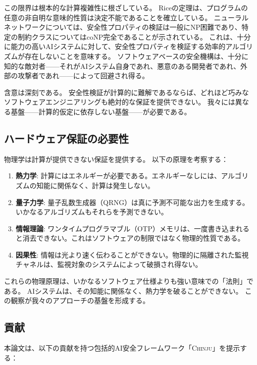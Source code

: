 \documentclass[11pt,a4paper]{article}
\newcommand{\chinju}{\textsc{Chinju}}
\begin{document}
この限界は根本的な計算複雑性に根ざしている。
Riceの定理は、プログラムの任意の非自明な意味的性質は決定不能であることを確立している。
ニューラルネットワークについては、安全性プロパティの検証は一般にNP困難であり、特定の制約クラスについてはcoNP完全であることが示されている。
これは、十分に能力の高いAIシステムに対して、安全性プロパティを検証する効率的アルゴリズムが存在しないことを意味する。
ソフトウェアベースの安全機構は、十分に知的な敵対者——それがAIシステム自身であれ、悪意のある開発者であれ、外部の攻撃者であれ——によって回避され得る。

含意は深刻である。
安全性検証が計算的に難解であるならば、どれほど巧みなソフトウェアエンジニアリングも絶対的な保証を提供できない。
我々には異なる基盤——計算的仮定に依存しない基盤——が必要である。

\subsection{ハードウェア保証の必要性}

物理学は計算が提供できない保証を提供する。
以下の原理を考察する：

\begin{enumerate}
    \item[(1)] \textbf{熱力学}: 計算にはエネルギーが必要である。エネルギーなしには、アルゴリズムの知能に関係なく、計算は発生しない。
    \item[(2)] \textbf{量子力学}: 量子乱数生成器（QRNG）は真に予測不可能な出力を生成する。いかなるアルゴリズムもそれらを予測できない。
    \item[(3)] \textbf{情報理論}: ワンタイムプログラマブル（OTP）メモリは、一度書き込まれると消去できない。これはソフトウェアの制限ではなく物理的性質である。
    \item[(4)] \textbf{因果性}: 情報は光より速く伝わることができない。物理的に隔離された監視チャネルは、監視対象のシステムによって破損され得ない。
\end{enumerate}

これらの物理原理は、いかなるソフトウェア仕様よりも強い意味での「法則」である。
AIシステムは、その知能に関係なく、熱力学を破ることができない。
この観察が我々のアプローチの基盤を形成する。

\subsection{貢献}

本論文は、以下の貢献を持つ包括的AI安全フレームワーク「\chinju{}」を提示する：
\end{document}
